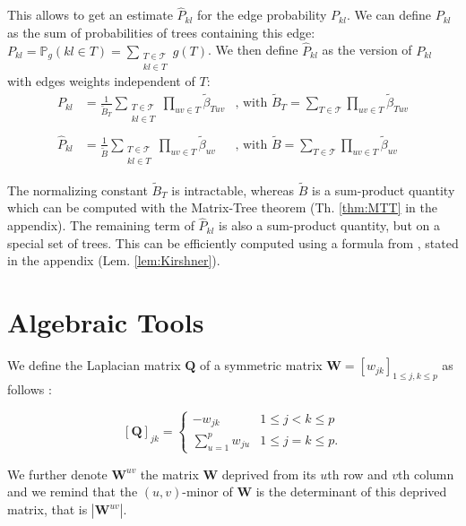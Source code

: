 \documentclass[11pt,a4paper]{article}
\newcommand{\Wbf}{\boldsymbol{W}}
\newcommand{\Qbf}{\boldsymbol{Q}}
\begin{document}
This allows to get an estimate $\hat{P}_{kl}$ for the edge probability $P_{kl}$. We can define $P_{kl}$ as the sum of probabilities of trees containing this edge: $P_{kl}=\mathds{P}_g(kl \in T)  = \sum_{\substack{T  \in \mathcal{T} \\ kl \in T }} g(T) $. We then define  $\hat{P}_{kl}$ as the version of $P_{kl}$ with edges weights independent of $T$:
\[
\begin{array}{ccl}
 P_{kl}& =\displaystyle\frac{1}{\widetilde{B}_T} \sum_{\substack{T  \in \mathcal{T} \\ kl \in T }} \prod_{uv \in T} \widetilde{\beta}_{Tuv} & \text{, with }\widetilde{B}_T= \sum_{T \in \mathcal{T} }\prod_{uv \in T}  \widetilde{\beta}_{Tuv}\\\\
\hat{P}_{kl} &=\displaystyle \frac{1}{\widetilde{B}} \sum_{\substack{T  \in \mathcal{T} \\ kl \in T }} \prod_{uv \in T} \widetilde{\beta}_{uv} &\text{, with } \widetilde{B}= \sum_{T \in \mathcal{T} }\prod_{uv \in T}  \widetilde{\beta}_{uv}
\end{array}\]
 
The normalizing constant $\widetilde{B}_T$ is intractable, whereas $\widetilde{B}$ is a sum-product quantity which can be computed with the Matrix-Tree theorem (Th. \ref{thm:MTT} in the appendix). The remaining term of $\hat{P}_{kl}$ is also a sum-product quantity, but on a special set of trees. This can be efficiently computed using a formula from \citet{kirshner}, stated in the appendix (Lem. \ref{lem:Kirshner}).
  

\newpage

 \appendix
 \section{Algebraic Tools}
 We define the Laplacian matrix $\Qbf$ of a symmetric matrix $\Wbf=[w_{jk} ]_{1\leq j,k\leq p}$ as follows :
 
\[
 [\Qbf]_{jk}  =\begin{cases}
    -w_{jk}  & 1\leq j<k \leq p\\
    \sum_{u=1}^p w_{ju} & 1\leq j=k \leq p.
    \end{cases}
\]
 
We further denote $\Wbf^{uv}$ the matrix $\Wbf$ deprived from its $u$th row and $v$th column and we remind that the $(u, v)$-minor of $\Wbf$ is the determinant of this deprived matrix, that is $|\Wbf^{uv}|$.
\end{document}
